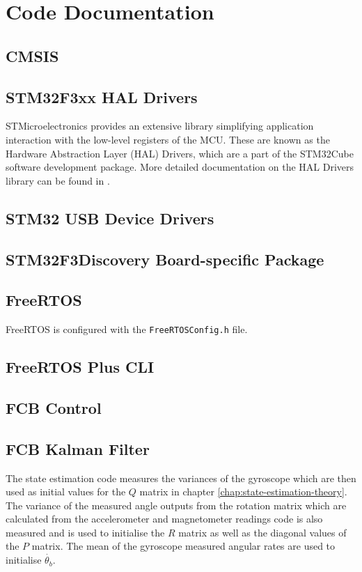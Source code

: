 \documentclass[a4paper]{report}
\begin{document}
	\section{Code Documentation}

		\subsection{CMSIS}

		\subsection{STM32F3xx HAL Drivers}
STMicroelectronics provides an extensive library simplifying application interaction with the low-level registers of the MCU. These are known as the Hardware Abstraction Layer (HAL) Drivers, which are a part of the STM32Cube software development package. More detailed documentation on the HAL Drivers library can be found in \cite{stm32f3haldrivers}.

		\subsection{STM32 USB Device Drivers}

		\subsection{STM32F3Discovery Board-specific Package}

		\subsection{FreeRTOS}
FreeRTOS is configured with the \texttt{FreeRTOSConfig.h} file.
		\subsection{FreeRTOS Plus CLI}

		\subsection{FCB Control}

		\subsection{FCB Kalman Filter}
The state estimation code measures the variances of the gyroscope which are then used as initial values for the $Q$ matrix in chapter \ref{chap:state-estimation-theory}. The variance of the measured angle outputs from the rotation matrix which are calculated from the accelerometer and magnetometer readings code is also measured and is used to initialise the $R$ matrix  as well as the diagonal values of the $P$ matrix. The mean of the gyroscope measured angular rates are used to initialise $\dot{\theta_{b}}$.
\end{document}
